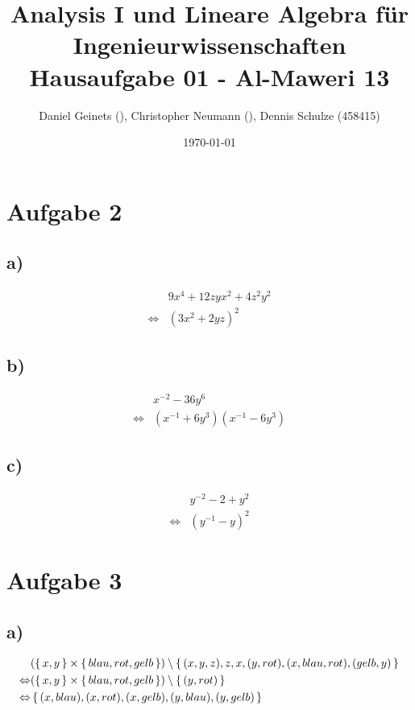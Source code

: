 \documentclass[a4paper, 11pt]{article}
\author{Daniel Geinets (), Christopher Neumann (), Dennis Schulze (458415)}
\date{\today}
\title{Analysis I und Lineare Algebra für Ingenieurwissenschaften \large  \\ Hausaufgabe 01 - Al-Maweri 13}
\begin{document}
\maketitle
\tableofcontents

\setcounter{secnumdepth}{0}

\pagebreak

\section{Aufgabe 2}
\label{sec:orgd60c41c}
\subsection{a)}
\label{sec:org47c5779}
\begin{align*}
    & 9x^4 + 12zyx^2 + 4z^2y^2 \\
    \Leftrightarrow & (3x^2 + 2yz)^2
\end{align*}

\subsection{b)}
\label{sec:org80016e0}
\begin{align*}
    & x^{-2} - 36y^6 \\
    \Leftrightarrow & (x^{-1} + 6y^3)(x^{-1} - 6y^3)
\end{align*}

\subsection{c)}
\label{sec:org01b6c89}
\begin{align*}
    & y^{-2} - 2 + y^2 \\
    \Leftrightarrow & (y^{-1} - y)^2
\end{align*}

\section{Aufgabe 3}
\label{sec:orgaef7c49}
\subsection{a)}
\label{sec:org191efbb}
\begin{align*}
    & ( \set{x, y}  \times \set{blau, rot, gelb}) \setminus \set{(x, y, z), z, x, (y, rot), (x, blau, rot), (gelb, y)} \\
    \Leftrightarrow & (\set{x, y} \times \set{blau, rot, gelb}) \setminus \set{(y, rot)} \\
    \Leftrightarrow & \set{(x, blau), (x, rot), (x, gelb), (y, blau), (y, gelb)}
\end{align*}
\end{document}
